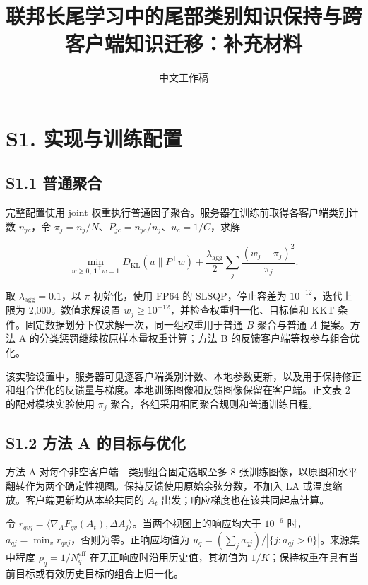 \documentclass[10pt,twocolumn,letterpaper]{article}
\author{中文工作稿}
\date{}
\title{联邦长尾学习中的尾部类别知识保持与跨客户端知识迁移：补充材料}
\begin{document}
\maketitle

\section*{S1. 实现与训练配置}

\subsection*{S1.1 普通聚合}

完整配置使用 joint 权重执行普通因子聚合。服务器在训练前取得各客户端类别计数 $n_{jc}$，令 $\pi_j=n_j/N$、$P_{jc}=n_{jc}/n_j$、$u_c=1/C$，求解


\begin{equation}\min_{w\geq0,\,\mathbf1^\top w=1}
D_{\mathrm{KL}}(u\|P^\top w)+\frac{\lambda_{\mathrm{agg}}}{2}
\sum_j\frac{(w_j-\pi_j)^2}{\pi_j}.\end{equation}

取 $\lambda_{\mathrm{agg}}=0.1$，以 $\pi$ 初始化，使用 FP64 的 SLSQP，停止容差为 $10^{-12}$，迭代上限为 2,000。数值求解设置 $w_j\geq10^{-12}$，并检查权重归一化、目标值和 KKT 条件。固定数据划分下仅求解一次，同一组权重用于普通 $B$ 聚合与普通 $A$ 提案。方法 A 的分类惩罚继续按原样本量权重计算；方法 B 的反馈客户端等权参与组合优化。


该实验设置中，服务器可见逐客户端类别计数、本地参数更新，以及用于保持修正和组合优化的反馈量与梯度。本地训练图像和反馈图像保留在客户端。正文表 2 的配对模块实验使用 $\pi_j$ 聚合，各组采用相同聚合规则和普通训练日程。


\subsection*{S1.2 方法 A 的目标与优化}

方法 A 对每个非空客户端—类别组合固定选取至多 8 张训练图像，以原图和水平翻转作为两个确定性视图。保持反馈使用原始余弦分数，不加入 LA 或温度缩放。客户端更新均从本轮共同的 $A_t$ 出发；响应梯度也在该共同起点计算。


令 $r_{qvj}=\langle\nabla_A F_{qv}(A_t),\Delta A_j\rangle$。当两个视图上的响应均大于 $10^{-6}$ 时，$a_{qj}=\min_v r_{qvj}$，否则为零。正响应均值为 $u_q=(\sum_j a_{qj})/|\{j:a_{qj}>0\}|$。来源集中程度 $\rho_q=1/N_q^{\mathrm{eff}}$ 在无正响应时沿用历史值，其初值为 $1/K$；保持权重在具有当前目标或有效历史目标的组合上归一化。
\end{document}
